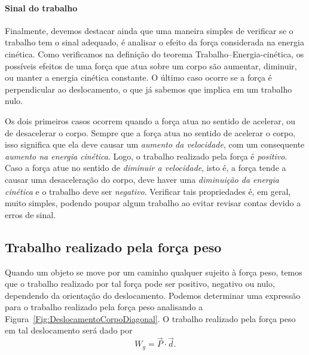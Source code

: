 \paragraph{Sinal do trabalho}

Finalmente, devemos destacar ainda que uma maneira simples de verificar se o trabalho tem o sinal adequado, é analisar o efeito da força considerada na energia cinética. Como verificamos na definição do teorema Trabalho--Energia-cinética, os possíveis efeitos de uma força que atua sobre um corpo são aumentar, diminuir, ou manter a energia cinética constante. O último caso ocorre se a força é perpendicular ao deslocamento, o que já sabemos que implica em um trabalho nulo.

Os dois primeiros casos ocorrem quando a força atua no sentido de acelerar, ou de desacelerar o corpo. Sempre que a força atua no sentido de acelerar o corpo, isso significa que ela deve causar um \emph{aumento da velocidade}, com um consequente \emph{aumento na energia cinética}. Logo, o trabalho realizado pela força é \emph{positivo}. Caso a força atue no sentido de \emph{diminuir a velocidade}, isto é, a força tende a causar uma desaceleração do corpo, deve haver uma \emph{diminuição da energia cinética} e o trabalho deve ser \emph{negativo}. Verificar tais propriedades é, em geral, muito simples, podendo poupar algum trabalho ao evitar revisar contas devido a erros de sinal.

\subsection{Trabalho realizado pela força peso}

Quando um objeto se move por um caminho qualquer sujeito à força peso, temos que o trabalho realizado por tal força pode ser positivo, negativo ou nulo, dependendo da orientação do deslocamento. Podemos determinar uma expressão para o trabalho realizado pela força peso analisando a Figura~\ref{Fig:DeslocamentoCorpoDiagonal}. O trabalho realizado pela força peso em tal deslocamento será dado por
\begin{equation}
  W_g = \vec{P}\cdot\vec{d}.
\end{equation}


